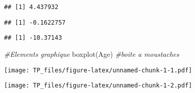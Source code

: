 \documentclass[
]{article}
\newenvironment{Shaded}{\begin{snugshade}}{\end{snugshade}}
\newcommand{\AttributeTok}[1]{\textcolor[rgb]{0.77,0.63,0.00}{#1}}
\newcommand{\CommentTok}[1]{\textcolor[rgb]{0.56,0.35,0.01}{\textit{#1}}}
\newcommand{\FunctionTok}[1]{\textcolor[rgb]{0.00,0.00,0.00}{#1}}
\newcommand{\NormalTok}[1]{#1}
\newcommand{\SpecialCharTok}[1]{\textcolor[rgb]{0.00,0.00,0.00}{#1}}
\newcommand{\StringTok}[1]{\textcolor[rgb]{0.31,0.60,0.02}{#1}}
\begin{document}
\begin{verbatim}
## [1] 4.437932
\end{verbatim}

\begin{Shaded}
\end{Shaded}

\begin{verbatim}
## [1] -0.1622757
\end{verbatim}

\begin{Shaded}
\end{Shaded}

\begin{verbatim}
## [1] -10.37143
\end{verbatim}

\begin{Shaded}
\begin{Highlighting}[]
\CommentTok{\#Elements graphique}
\FunctionTok{boxplot}\NormalTok{(Age) }\CommentTok{\#boite a moustaches}
\end{Highlighting}
\end{Shaded}

\texttt{[image: TP\_files/figure-latex/unnamed-chunk-1-1.pdf]}

\begin{Shaded}
\end{Shaded}

\texttt{[image: TP\_files/figure-latex/unnamed-chunk-1-2.pdf]}
\end{document}
